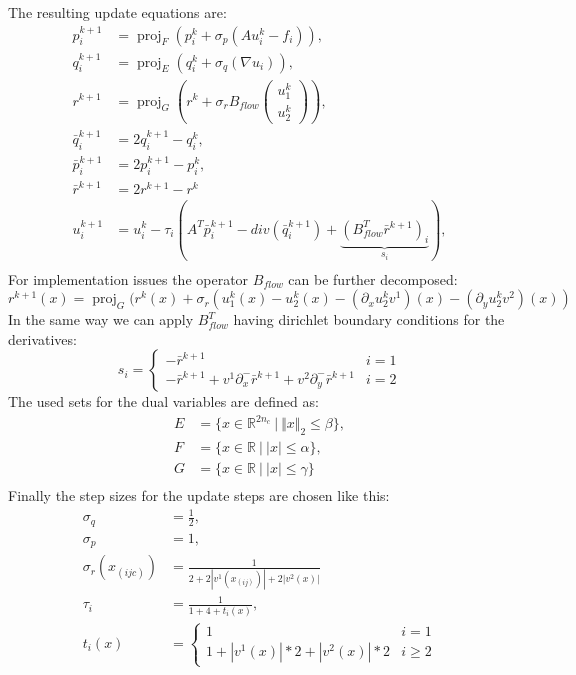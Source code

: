 \documentclass[A4,12pt]{article}
\DeclareMathOperator*{\proj}{proj}
\newcommand{\R}{\mathbb{R}}
\newcommand{\norm}[1]{\Vert #1 \Vert}
\begin{document}
The resulting update equations are:
\begin{equation}
\begin{aligned}
p_i^{k+1}&=\proj_F(p_i^k + \sigma_p (Au_i^k - f_i)), \\
q_i^{k+1}&=\proj_E(q_i^k + \sigma_q (\nabla u_i)), \\
r^{k+1}&=\proj_G\left(r^{k} + \sigma_r B_{flow}\begin{pmatrix}u_1^k \\ u_2^k\end{pmatrix}\right), \\
\bar q_i^{k+1} &= 2q_i^{k+1} - q_i^k,\\
\bar p_i^{k+1} &= 2p_i^{k+1} - p_i^k,\\
\bar r^{k+1} &= 2r^{k+1} - r^k\\
u_i^{k+1}&=u_i^k-\tau_i(A^T\bar p_i^{k+1}-div(\bar q_i^{k+1})+\underbrace{(B_{flow}^T\bar r^{k+1})_i}_{s_i}), \\
\end{aligned}
\end{equation}
For implementation issues the operator $B_{flow}$ can be further decomposed:
\begin{equation}
r^{k+1}(x) = \proj_G(r^{k}(x) + \sigma_r(u_1^k(x)-u_2^k(x)-(\partial_xu_2^kv^1)(x)-(\partial_yu_2^kv^2)(x))
\end{equation}
In the same way we can apply $B_{flow}^T$ having dirichlet boundary conditions for the derivatives:
\begin{equation}
s_i =
\begin{cases}
-\bar r^{k+1} & i=1 \\
-\bar r^{k+1} + v^1\partial^-_x\bar r^{k+1} + v^2\partial^-_y \bar r^{k+1} & i=2
\end{cases}
\end{equation}
The used sets for the dual variables are defined as:
\begin{equation}
\begin{aligned}
E &= \{x \in \R^{2n_c} ~|~ \norm{x}_2 \leq \beta \}, \\
F &= \{x \in \R ~|~ |x| \leq \alpha \}, \\
G &= \{x \in \R ~|~ |x| \leq \gamma \} \\
\end{aligned}
\end{equation}
Finally the step sizes for the update steps are chosen like this:
\begin{equation}
\begin{aligned}
\sigma_q &= \frac{1}{2}, \\
\sigma_p &= 1, \\
\sigma_r (x_{(ijc)}) &= \frac{1}{2+2|v^1(x_{(ij)})|+2|v^2(x)|} \\
\tau_i&=\frac{1}{1+4+t_i(x)}, \\
t_i(x)&=\begin{cases} 1 & i=1 \\ 1+|v^1(x)|*2+|v^2(x)|*2 & i \geq 2 \end{cases}
\end{aligned}
\end{equation}
\end{document}
